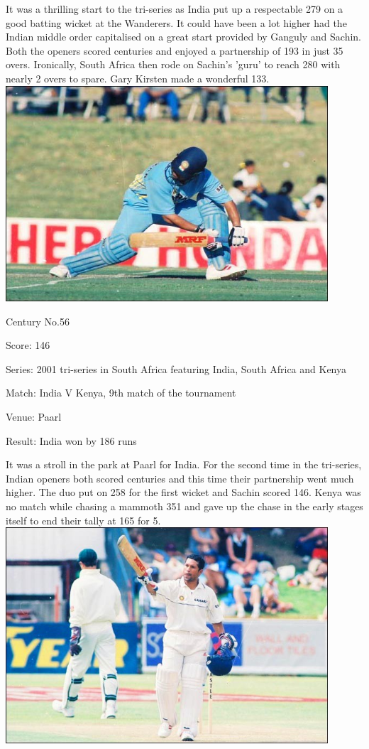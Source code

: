 \documentclass[11pt, a4paper]{article}
\begin{document}
It was a thrilling start to the tri-series as India put up a respectable 279 on a good batting wicket at the Wanderers. It could have been a lot higher had the Indian middle order capitalised on a great start provided by Ganguly and Sachin. Both the openers scored centuries and enjoyed a partnership of 193 in just 35 overs. Ironically, South Africa then rode on Sachin's 'guru' to reach 280 with nearly 2 overs to spare. Gary Kirsten made a wonderful 133.
\newpage
\includegraphics[width=0.9\textwidth]{pics/56.jpg}

Century No.56 

Score: 146 

Series: 2001 tri-series in South Africa featuring India, South Africa and Kenya 

Match: India V Kenya, 9th match of the tournament 

Venue: Paarl 

Result: India won by 186 runs 

It was a stroll in the park at Paarl for India. For the second time in the tri-series, Indian openers both scored centuries and this time their partnership went much higher. The duo put on 258 for the first wicket and Sachin scored 146. Kenya was no match while chasing a mammoth 351 and gave up the chase in the early stages itself to end their tally at 165 for 5.
\newpage
\includegraphics[width=0.9\textwidth]{pics/57.jpg}
\end{document}

